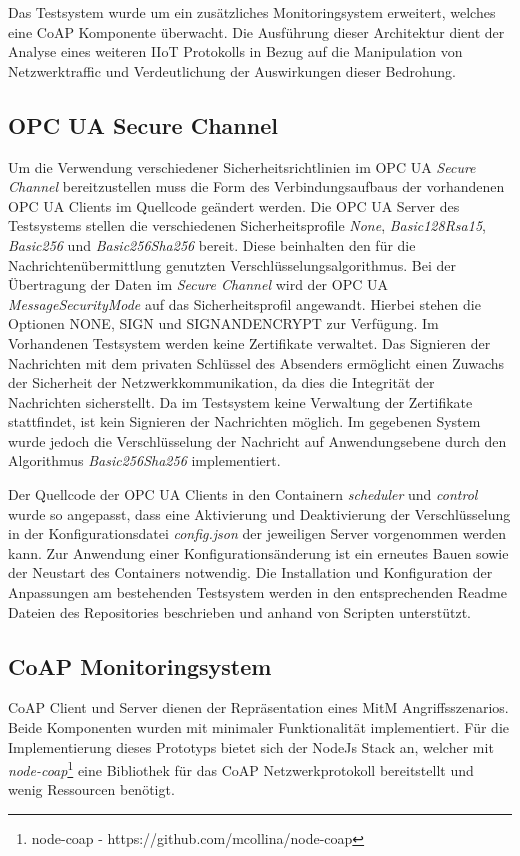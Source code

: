 Das Testsystem wurde um ein zusätzliches Monitoringsystem erweitert, welches eine \ac{CoAP} Komponente überwacht. Die Ausführung dieser Architektur dient der Analyse eines weiteren \ac{IIoT} Protokolls in Bezug auf die Manipulation von Netzwerktraffic und Verdeutlichung der Auswirkungen dieser Bedrohung.

\subsection{\ac{OPC UA} Secure Channel}
\label{Umsetzung:OPC UA Secure Channel}
Um die Verwendung verschiedener Sicherheitsrichtlinien im \ac{OPC UA} \textit{Secure Channel} bereitzustellen muss die Form des Verbindungsaufbaus der vorhandenen \ac{OPC UA} Clients im Quellcode geändert werden. Die \ac{OPC UA} Server des Testsystems stellen die verschiedenen Sicherheitsprofile \textit{None}, \textit{Basic128Rsa15}, \textit{Basic256} und \textit{Basic256Sha256} bereit. Diese beinhalten den für die Nachrichtenübermittlung genutzten Verschlüsselungsalgorithmus. Bei der Übertragung der Daten im \textit{Secure Channel} wird der \ac{OPC UA} \textit{MessageSecurityMode} auf das Sicherheitsprofil angewandt. Hierbei stehen die Optionen NONE, SIGN und SIGNANDENCRYPT zur Verfügung. Im Vorhandenen Testsystem werden keine Zertifikate verwaltet. Das Signieren der Nachrichten mit dem privaten Schlüssel des Absenders ermöglicht einen Zuwachs der Sicherheit der Netzwerkkommunikation, da dies die Integrität der Nachrichten sicherstellt. Da im Testsystem keine Verwaltung der Zertifikate stattfindet, ist kein Signieren der Nachrichten möglich. Im gegebenen System wurde jedoch die Verschlüsselung der Nachricht auf Anwendungsebene durch den Algorithmus \textit{Basic256Sha256} implementiert.

Der Quellcode der \ac{OPC UA} Clients in den Containern \textit{scheduler} und \textit{control} wurde so angepasst, dass eine Aktivierung und Deaktivierung der Verschlüsselung in der Konfigurationsdatei \textit{config.json} der jeweiligen Server vorgenommen werden kann. Zur Anwendung einer Konfigurationsänderung ist ein erneutes Bauen sowie der Neustart des Containers notwendig. Die Installation und Konfiguration der Anpassungen am bestehenden Testsystem werden in den entsprechenden Readme Dateien des Repositories beschrieben und anhand von Scripten unterstützt.

\subsection{\ac{CoAP} Monitoringsystem}
\ac{CoAP} Client und Server dienen der Repräsentation eines \ac{MitM} Angriffsszenarios. Beide Komponenten wurden mit minimaler Funktionalität implementiert. Für die Implementierung dieses Prototyps bietet sich der NodeJs Stack an, welcher mit \textit{node-coap}\footnote{node-coap - https://github.com/mcollina/node-coap} eine Bibliothek für das \ac{CoAP} Netzwerkprotokoll bereitstellt und wenig Ressourcen benötigt.

